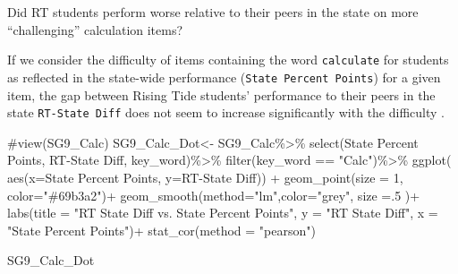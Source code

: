 \documentclass[
  letterpaper,
  DIV=11,
  numbers=noendperiod]{scrartcl}
\newenvironment{Shaded}{\begin{snugshade}}{\end{snugshade}}
\newcommand{\AttributeTok}[1]{\textcolor[rgb]{0.40,0.45,0.13}{#1}}
\newcommand{\CommentTok}[1]{\textcolor[rgb]{0.37,0.37,0.37}{#1}}
\newcommand{\DecValTok}[1]{\textcolor[rgb]{0.68,0.00,0.00}{#1}}
\newcommand{\FunctionTok}[1]{\textcolor[rgb]{0.28,0.35,0.67}{#1}}
\newcommand{\NormalTok}[1]{\textcolor[rgb]{0.00,0.23,0.31}{#1}}
\newcommand{\OtherTok}[1]{\textcolor[rgb]{0.00,0.23,0.31}{#1}}
\newcommand{\SpecialCharTok}[1]{\textcolor[rgb]{0.37,0.37,0.37}{#1}}
\newcommand{\StringTok}[1]{\textcolor[rgb]{0.13,0.47,0.30}{#1}}
\begin{document}
Did RT students perform worse relative to their peers in the state on
more ``challenging'' calculation items?

If we consider the difficulty of items containing the word
\texttt{calculate} for students as reflected in the state-wide
performance (\texttt{State\ Percent\ Points}) for a given item, the gap
between Rising Tide students' performance to their peers in the state
\texttt{RT-State\ Diff} does not seem to increase significantly with the
difficulty .

\begin{Shaded}
\begin{Highlighting}[]
\CommentTok{\#view(SG9\_Calc)}
\NormalTok{SG9\_Calc\_Dot}\OtherTok{\textless{}{-}}\NormalTok{ SG9\_Calc}\SpecialCharTok{\%\textgreater{}\%}
  \FunctionTok{select}\NormalTok{(}\StringTok{\textasciigrave{}}\AttributeTok{State Percent Points}\StringTok{\textasciigrave{}}\NormalTok{, }\StringTok{\textasciigrave{}}\AttributeTok{RT{-}State Diff}\StringTok{\textasciigrave{}}\NormalTok{, }\StringTok{\textasciigrave{}}\AttributeTok{key\_word}\StringTok{\textasciigrave{}}\NormalTok{)}\SpecialCharTok{\%\textgreater{}\%}
  \FunctionTok{filter}\NormalTok{(key\_word }\SpecialCharTok{==} \StringTok{"Calc"}\NormalTok{)}\SpecialCharTok{\%\textgreater{}\%}
  \FunctionTok{ggplot}\NormalTok{( }\FunctionTok{aes}\NormalTok{(}\AttributeTok{x=}\StringTok{\textasciigrave{}}\AttributeTok{State Percent Points}\StringTok{\textasciigrave{}}\NormalTok{, }\AttributeTok{y=}\StringTok{\textasciigrave{}}\AttributeTok{RT{-}State Diff}\StringTok{\textasciigrave{}}\NormalTok{)) }\SpecialCharTok{+}
     \FunctionTok{geom\_point}\NormalTok{(}\AttributeTok{size =} \DecValTok{1}\NormalTok{, }\AttributeTok{color=}\StringTok{"\#69b3a2"}\NormalTok{)}\SpecialCharTok{+}
 \FunctionTok{geom\_smooth}\NormalTok{(}\AttributeTok{method=}\StringTok{"lm"}\NormalTok{,}\AttributeTok{color=}\StringTok{"grey"}\NormalTok{, }\AttributeTok{size =}\NormalTok{.}\DecValTok{5}\NormalTok{ )}\SpecialCharTok{+}
  \FunctionTok{labs}\NormalTok{(}\AttributeTok{title =} \StringTok{"RT State Diff vs. State Percent Points"}\NormalTok{, }\AttributeTok{y =} \StringTok{"RT State Diff"}\NormalTok{,}
       \AttributeTok{x =} \StringTok{"State Percent Points"}\NormalTok{)}\SpecialCharTok{+}
    \FunctionTok{stat\_cor}\NormalTok{(}\AttributeTok{method =} \StringTok{"pearson"}\NormalTok{)}

\NormalTok{SG9\_Calc\_Dot}
\end{Highlighting}
\end{Shaded}
\end{document}

